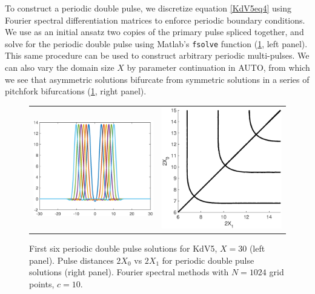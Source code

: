 \documentclass[10pt,reqno]{amsart}
\theoremstyle{plain}
\theoremstyle{definition}
\theoremstyle{remark}
\numberwithin{theorem}{section}
\numberwithin{equation}{section}
\begin{document}
To construct a periodic double pulse, we discretize equation \cref{KdV5eq4} using Fourier spectral differentiation matrices to enforce periodic boundary conditions. We use as an initial ansatz two copies of the primary pulse spliced together, and solve for the periodic double pulse using Matlab's \texttt{fsolve} function (\cref{fig:KdV5doublepulse}, left panel). This same procedure can be used to construct arbitrary periodic multi-pulses. We can also vary the domain size $X$ by parameter continuation in AUTO, from which we see that asymmetric solutions bifurcate from symmetric solutions in a series of pitchfork bifurcations (\cref{fig:KdV5doublepulse}, right panel). 
\begin{figure}
\begin{center}
\begin{tabular}{cc}
\includegraphics[width=7.5cm]{images/double10.eps} &
\includegraphics[width=7.5cm]{images/periodicpitchfork.eps}
\end{tabular}
\end{center}
\caption[Double pulse solutions for KdV5]{First six periodic double pulse solutions for KdV5, $X = 30$ (left panel). Pulse distances $2 X_0$ vs $2 X_1$ for periodic double pulse solutions (right panel). Fourier spectral methods with $N = 1024$ grid points, $c = 10$.}
\label{fig:KdV5doublepulse}
\end{figure}
\end{document}

